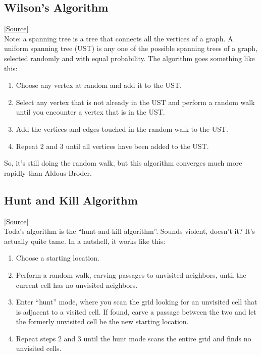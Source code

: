 \documentclass{article}
\begin{document}
\subsection*{Wilson's Algorithm}
[\href{https://weblog.jamisbuck.org/2011/1/20/maze-generation-wilson-s-algorithm}{Source}]\\
Note: a spanning tree is a tree that connects all the vertices of a graph. A uniform spanning tree (UST) is any one of the possible spanning trees of a graph, selected randomly and with equal probability.
The algorithm goes something like this:
\begin{enumerate}
    \item Choose any vertex at random and add it to the UST.
    \item Select any vertex that is not already in the UST and perform a random walk until you encounter a vertex that is in the UST.
    \item Add the vertices and edges touched in the random walk to the UST.
    \item Repeat 2 and 3 until all vertices have been added to the UST.
\end{enumerate}

So, it's still doing the random walk, but this algorithm converges much more rapidly than Aldous-Broder.
\subsection*{Hunt and Kill Algorithm}
\label{hunt_n_kill}
[\href{https://weblog.jamisbuck.org/2011/1/24/maze-generation-hunt-and-kill-algorithm}{Source}]\\
Toda's algorithm is the “hunt-and-kill algorithm”. Sounds violent, doesn't it? It's actually quite tame. In a nutshell, it works like this:

\begin{enumerate}
    \item Choose a starting location.
    \item Perform a random walk, carving passages to unvisited neighbors, until the current cell has no unvisited neighbors.
    \item Enter “hunt” mode, where you scan the grid looking for an unvisited cell that is adjacent to a visited cell. If found, carve a passage between the two and let the formerly unvisited cell be the new starting location.
    \item Repeat steps 2 and 3 until the hunt mode scans the entire grid and finds no unvisited cells.
\end{enumerate}
\end{document}
